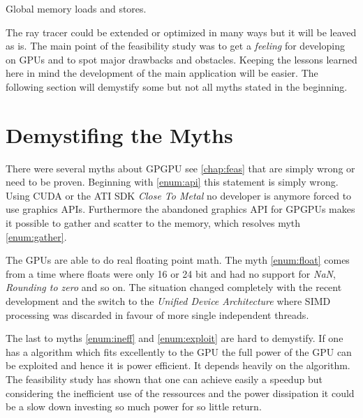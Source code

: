 \begin{table}[ht]
    \centering
  	\caption[Global memory loads and stores]{Global memory loads and stores.}
  	\label{tab:globalmem}
\end{table}

The ray tracer could be extended or optimized in many ways but it will be leaved as is. The main point of the feasibility study was to get a \emph{feeling} for developing on \glspl{GPU} and to spot major drawbacks and obstacles. Keeping the lessons learned here in mind the development of the main application will be easier. The following section will demystify some but not all myths stated in the beginning.

\section{Demystifing the Myths} %
\label{sec:demystifing_the_myths}
There were several myths about \gls{GPGPU} see \autoref{chap:feas} that are simply wrong or need to be proven. Beginning with \autoref{enum:api} this statement is 
simply wrong. Using \gls{CUDA} or the ATI \gls{SDK} \emph{Close To Metal}
no developer is anymore forced to use graphics \glspl{API}. Furthermore the abandoned graphics \gls{API} for \glspl{GPGPU} makes it possible to gather and scatter to the memory, which resolves myth \autoref{enum:gather}. 

The \glspl{GPU} are able to do real floating point math. The myth \autoref{enum:float} comes from a time where floats were only 16 or 24 bit and had no support for \emph{NaN}, \emph{Rounding to zero} and so on. The situation changed completely with the recent development and the switch to the \emph{Unified Device Architecture} where \gls{SIMD} processing was discarded in 
favour of more single independent threads. 

The last to myths \autoref{enum:ineff} and \autoref{enum:exploit} are hard to demystify.
If one has a algorithm which fits excellently to the \gls{GPU} the full power of
the \gls{GPU} can be exploited and hence it is power efficient. It depends
heavily on the algorithm. The feasibility study has shown that one can achieve
easily a speedup but considering the inefficient use of the ressources and the
power dissipation it could be a slow down investing so much power for so little
return.








